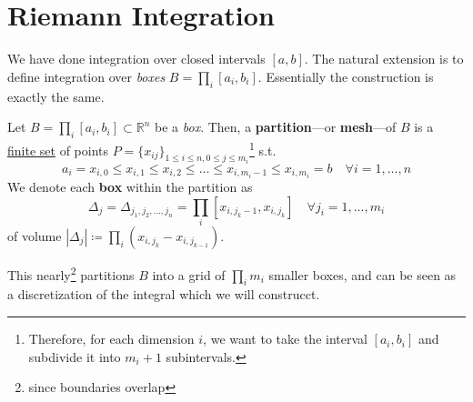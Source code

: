 \section{Riemann Integration} 

  We have done integration over closed intervals $[a, b]$. The natural extension is to define integration over \textit{boxes} $B = \prod_i [a_i, b_i]$. Essentially the construction is exactly the same. 

  \begin{definition}
    \label{def:partition-mesh}
    Let $B = \prod_i [a_i, b_i] \subset \mathbb{R}^n$ be a \textit{box}. Then, a \textbf{partition}---or \textbf{mesh}---of $B$ is a \hyperref[st-def:finite-set]{finite set} of points $P = \{x_{ij}\}_{1 \leq i \leq n, 0 \leq j \leq m_i}$\footnote{Therefore, for each dimension $i$, we want to take the interval $[a_i, b_i]$ and subdivide it into $m_i+1$ subintervals.} s.t. 
    \begin{equation}
      a_i = x_{i, 0} \leq x_{i, 1} \leq x_{i, 2} \leq \ldots \leq x_{i, m_i-1} \leq x_{i, m_i} = b \quad \forall i = 1, \ldots, n
    \end{equation}
    We denote each \textbf{box} within the partition as 
    \begin{equation}
      \Delta_j = \Delta_{j_1, j_2, \ldots, j_n} = \prod_{i} [x_{i, j_k-1}, x_{i, j_k}] \quad \forall j_i = 1, \ldots, m_i
    \end{equation}
    of volume $|\Delta_j| \coloneqq \prod_{i} (x_{i, j_k} - x_{i, j_{k-1}})$. 
  \end{definition}

  This nearly\footnote{since boundaries overlap} partitions $B$ into a grid of $\prod_i m_i$ smaller boxes, and can be seen as a discretization of the integral which we will construcct. 

